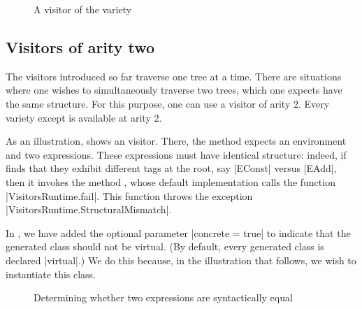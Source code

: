 \documentclass[11pt,a4paper,twoside]{article}
\begin{document}

\begin{figure}[p]
\vspace{-\baselineskip}
\caption{A visitor of the \itertwo variety}
\label{fig:expr02}
\end{figure}

\begin{comment}
\begin{figure}[p]
\orig{expr03}
\vspace{-\baselineskip}
\processed{expr03}
\caption{A visitor of the \maptwo variety}
\label{fig:expr03}
\end{figure}
\end{comment}

\subsection{Visitors of arity two}
\label{sec:intro:aritytwo}

The visitors introduced so far traverse one tree at a time. There are
situations where one wishes to simultaneously traverse two trees, which one
expects have the same structure. For this purpose, one can use a visitor of
arity 2. Every variety except \mapendo is available at arity 2.

As an illustration,  shows an \itertwo visitor. There, the
method  expects an environment and two expressions. These
expressions must have identical structure: indeed, if 
finds that they exhibit different tags at the root, say \oc|EConst| versus
\oc|EAdd|, then it invokes the method , whose default
implementation calls the function \oc|VisitorsRuntime.fail|. This function
throws the exception \oc|VisitorsRuntime.StructuralMismatch|.

In , we have added the optional parameter
%
\oc|concrete = true|
%
to indicate that the generated class should not be virtual. (By default,
every generated class is declared \oc|virtual|.) We do this because, in
the illustration that follows, we wish to instantiate this class.


\begin{figure}[p]
\caption{Determining whether two expressions are syntactically equal}
\label{fig:expr05}
\end{figure}
\end{document}
